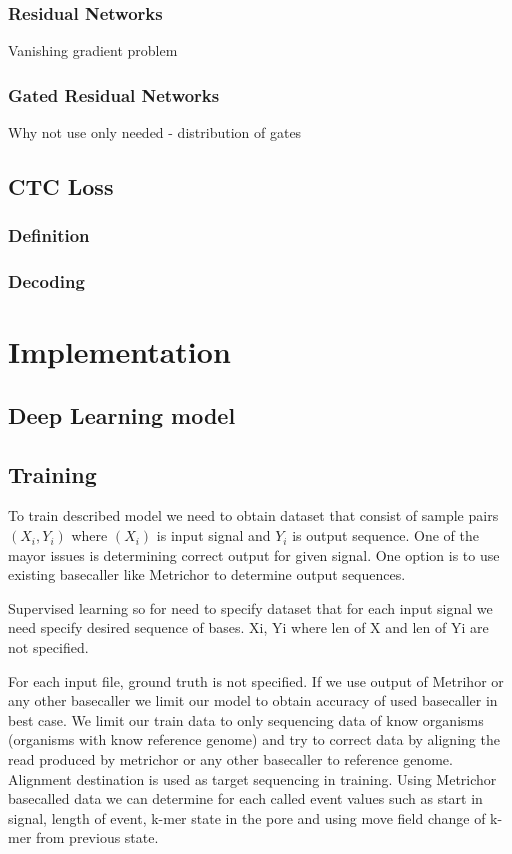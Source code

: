 \documentclass[times, utf8, diplomski, english]{fer}
\begin{document}
\subsection{Residual Networks}
Vanishing gradient problem
\subsection{Gated Residual Networks}
Why not use only needed - distribution of gates

\section{CTC Loss}
\subsection{Definition}
\subsection{Decoding}


\chapter{Implementation}
\section{Deep Learning model}
\section{Training}

To train described model we need to obtain dataset that consist of sample pairs $(X_i, Y_i)$ where $(X_i)$ is input signal and $Y_i$ is output sequence. 
One of the mayor issues is determining correct output for given signal. One option is to use existing basecaller like Metrichor to determine output sequences. 

 




Supervised learning so for need to specify dataset that for each input signal we need specify desired sequence of bases.
{Xi, Yi} where len of X and len of Yi are not specified.

For each input file, ground truth is not specified. If we use output of Metrihor or any other basecaller we limit our model to
obtain accuracy of used basecaller in best case. We limit our train data to only sequencing data of know organisms (organisms with know reference genome) and try to correct data by aligning the read produced by metrichor or any other basecaller to reference genome. Alignment destination is used as target sequencing in training. 
Using Metrichor basecalled data we can determine for each called event values such as start in signal, length of event, k-mer state in the pore and using move field change of k-mer from previous state. 
\end{document}
